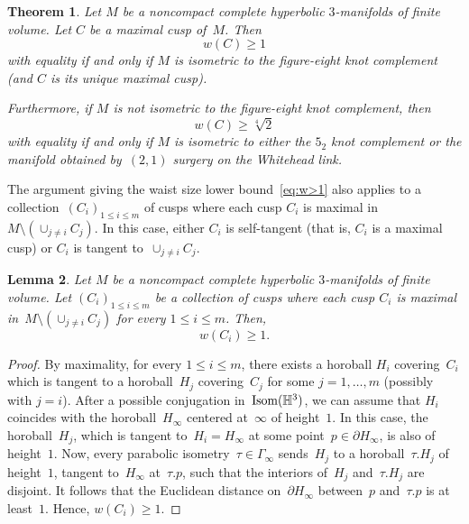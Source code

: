 \documentclass[11pt,reqno]{amsart}
\newtheorem{theorem}{Theorem}[section]
\newtheorem{lemma}[theorem]{Lemma}
\theoremstyle{definition}
\numberwithin{equation}{section}
\newcommand{\HH}{{\mathbb H}}
\DeclareMathOperator{\Isom}{{\rm Isom}}
\numberwithin{equation}{section}
\begin{document}
\begin{theorem} \label{theo:waist}
Let $M$ be a noncompact complete hyperbolic $3$-manifolds of finite volume.
Let $C$ be a maximal cusp of~$M$.
Then
\begin{equation} \label{eq:w>1}
w(C) \geq 1
\end{equation}
with equality if and only if $M$ is isometric to the figure-eight knot complement (and $C$ is its unique maximal cusp).

Furthermore, if $M$ is not isometric to the figure-eight knot complement, then
\begin{equation} \label{eq:w>2}
w(C) \geq \sqrt[4]{2}
\end{equation}
with equality if and only if $M$ is isometric to either the $5_2$ knot complement or the manifold obtained by~$(2,1)$ surgery on the Whitehead link.
\end{theorem}

The argument giving the waist size lower bound~\eqref{eq:w>1} also applies to a collection~$(C_i)_{1 \leq i \leq m}$ of cusps where each cusp $C_i$ is maximal in~$M \setminus (\cup_{j \neq i} C_j)$.
In this case, either $C_i$ is self-tangent (that is, $C_i$ is a maximal cusp) or $C_i$ is tangent to~$\cup_{j \neq i} C_j$.

\begin{lemma} \label{lem:waist_collection}
Let $M$ be a noncompact complete hyperbolic $3$-manifolds of finite volume.
Let $(C_i)_{1 \leq i \leq m}$ be a collection of cusps where each cusp $C_i$ is maximal in~$M \setminus (\cup_{j \neq i} C_j)$ for every $1 \leq i \leq m$.
Then,
\[
w(C_i) \geq 1.
\]
\end{lemma}

\begin{proof}
By maximality, for every $1 \leq i \leq m$, there exists a horoball $H_i$ covering~$C_i$ which is tangent to a horoball~$H_j$ covering~$C_j$ for some $j=1,\dots,m$ (possibly with $j=i$).
After a possible conjugation in~$\Isom(\HH^3)$, we can assume that $H_i$ coincides with the horoball~$H_\infty$ centered at~$\infty$ of height~$1$.
In this case, the horoball~$H_j$, which is tangent to~$H_i=H_\infty$ at some point~$p \in \partial H_\infty$, is also of height~$1$.
Now, every parabolic isometry~$\tau \in \Gamma_\infty$ sends~$H_j$ to a horoball~$\tau.H_j$ of height~$1$, tangent to~$H_\infty$ at~$\tau.p$, such that the interiors of~$H_j$ and~$\tau.H_j$ are disjoint.
It follows that the Euclidean distance on~$\partial H_\infty$ between~$p$ and~$\tau.p$ is at least~$1$.
Hence, $w(C_i) \geq 1$.
\end{proof}
\end{document}
